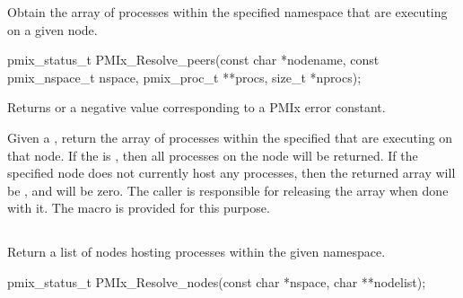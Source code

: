 Obtain the array of processes within the specified namespace that are executing on a given node.

\format

\cspecificstart
\begin{codepar}
pmix_status_t
PMIx_Resolve_peers(const char *nodename,
                   const pmix_nspace_t nspace,
                   pmix_proc_t **procs, size_t *nprocs);
\end{codepar}
\cspecificend

\begin{arglist}
\end{arglist}

Returns  or a negative value corresponding to a PMIx error constant.

\descr

Given a , return the array of processes within the specified 
that are executing on that node.
If the  is , then all processes on the node will be returned.
If the specified node does not currently host any processes, then the returned array will be , and  will be zero.
The caller is responsible for releasing the  array when done with it.
The  macro is provided for this purpose.


\subsection{}

\summary

Return a list of nodes hosting processes within the given namespace.

\format

\cspecificstart
\begin{codepar}
pmix_status_t
PMIx_Resolve_nodes(const char *nspace, char **nodelist);
\end{codepar}
\cspecificend

\begin{arglist}
\end{arglist}

